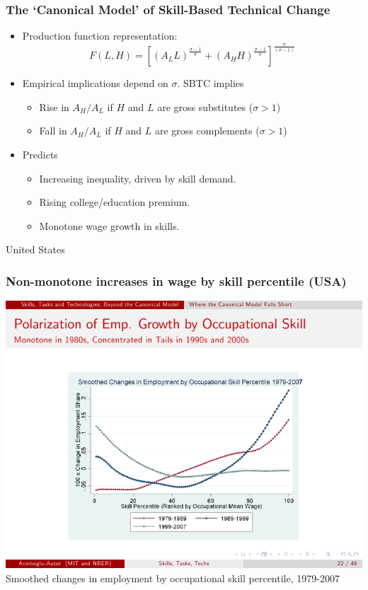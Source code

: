 \documentclass[red]{beamer}
\begin{document}
\begin{frame}
\frametitle{The `Canonical Model' of Skill-Based Technical Change}
\begin{itemize}
\item Production function representation:
\begin{equation}
  \label{eq:cobbdoug}
  F(L,H) = \left[\left(A_LL\right)^{\frac{\sigma - 1}{\sigma}}
            + \left(A_HH\right)^{\frac{\sigma - 1}{\sigma}}
          \right]^\frac{\sigma}{(\sigma-1)}
\end{equation}
\item Empirical implications depend on $\sigma$. SBTC implies
  \begin{itemize}
  \item Rise in $A_H/A_L$ if $H$ and $L$ are gross substitutes ($\sigma > 1$)
  \item Fall in $A_H/A_L$ if $H$ and $L$ are gross complements ($\sigma > 1$)
  \end{itemize}
\item Predicts
  \begin{itemize}
  \item Increasing inequality, driven by skill demand.
  \item Rising college/education premium.
  \item Monotone wage growth in skills.
  \end{itemize}
\end{itemize}
\end{frame}

\begin{frame}[t]{United States}
\frametitle{Non-monotone increases in wage by skill percentile (USA)}
\begin{center}
\includegraphics[width=\textwidth]{slides/emp_occ_skill_percentile.pdf}
\\
Smoothed changes in employment by occupational skill percentile, 1979-2007
\citep{Acemoglu2011}
\end{center}
\end{frame}
\end{document}
